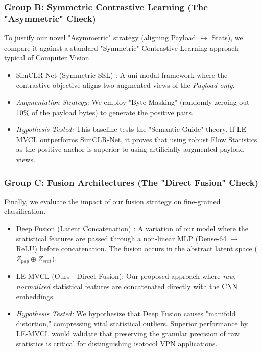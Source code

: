 \subsubsection{Group B: Symmetric Contrastive Learning (The "Asymmetric" Check)}
To justify our novel "Asymmetric" strategy (aligning Payload $\leftrightarrow$ Stats), we compare it against a standard "Symmetric" Contrastive Learning approach typical of Computer Vision.
\begin{itemize}
    \item SimCLR-Net (Symmetric SSL) \cite{chen2020simple}: 
    A uni-modal framework where the contrastive objective aligns two augmented views of the \textit{Payload only}.
    \item \textit{Augmentation Strategy:} We employ "Byte Masking" (randomly zeroing out 10\% of the payload bytes) to generate the positive pairs.
    \item \textit{Hypothesis Tested:} This baseline tests the "Semantic Guide" theory. If LE-MVCL outperforms SimCLR-Net, it proves that using robust Flow Statistics as the positive anchor is superior to using artificially augmented payload views.
\end{itemize}

\subsubsection{Group C: Fusion Architectures (The "Direct Fusion" Check)}
Finally, we evaluate the impact of our fusion strategy on fine-grained classification.
\begin{itemize}
    \item Deep Fusion (Latent Concatenation) \cite{zeng2019deep}: 
    A variation of our model where the statistical features are passed through a non-linear MLP (Dense-64 $\rightarrow$ ReLU) before concatenation. The fusion occurs in the abstract latent space ($Z_{pay} \oplus Z_{stat}$).
    \item LE-MVCL (Ours - Direct Fusion): 
    Our proposed approach where \textit{raw, normalized} statistical features are concatenated directly with the CNN embeddings.
    \item \textit{Hypothesis Tested:} We hypothesize that Deep Fusion causes "manifold distortion," compressing vital statistical outliers. Superior performance by LE-MVCL would validate that preserving the granular precision of raw statistics is critical for distinguishing isotocol VPN applications.
\end{itemize}

